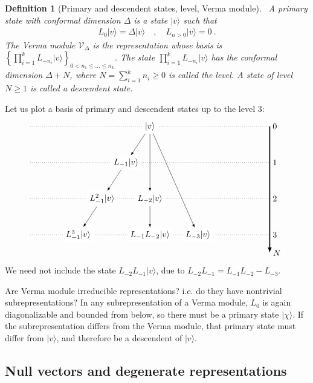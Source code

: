\documentclass[12pt, a4paper]{article}
\theoremstyle{break}
\newtheorem{defn}[exo]{Definition}
\begin{document}
\begin{defn}[Primary and descendent states, level, Verma module]
 ~\label{def:prim}
 A primary state with conformal dimension $\Delta$ is a state $|v\rangle$ such that 
 \begin{align}
  L_0 |v\rangle = \Delta |v\rangle \quad , \quad L_{n>0} |v\rangle = 0\ .
 \end{align}
The Verma module $\mathcal V_\Delta$ is the representation whose basis is 
 $
 \left\{ \prod_{i=1}^k L_{-n_i} |v\rangle\right\}_{ 0<n_1\leq \dots \leq n_k}
 $.
The state $\prod_{i=1}^k L_{-n_i} |v\rangle $ has the conformal dimension $\Delta+N$, where $N=\sum_{i=1}^k n_i\geq 0$ is called the level. A state of level $N\geq 1$ is called a descendent state.
\end{defn}
Let us plot a basis of primary and descendent states up to the level $3$:
\begin{align}
 \begin{tikzpicture}[scale = .25, baseline=(current  bounding  box.center)]
  \draw[-latex, very thick] (20, 0) -- (20, -21) node [right] {$N$};
  \foreach \x in {0, ..., 3}
  {
  \draw [dotted] (-20, {-6*\x}) -- (20, {-6*\x}) node [right] {${\x}$};
  }
  \node[fill = white] at (0, 0) (0) {$|v\rangle$};
  \node[fill = white] at (-4,-6) (1) {$L_{-1}|v\rangle$};
  \node[fill = white] at (-8, -12) (11) {$L_{-1}^2|v\rangle$};
  \node[fill = white] at (-12, -18) (111) {$L_{-1}^3|v\rangle$};
  \node[fill = white] at (0,-12) (2) {$L_{-2}|v\rangle$};
  \node[fill = white] at (0,-18) (12) {$L_{-1}L_{-2}|v\rangle$};
  \node[fill = white] at (8,-18) (3) {$L_{-3}|v\rangle$};
  \draw[-latex] (0) -- (1);
  \draw[-latex] (1) -- (11);
  \draw[-latex] (11) -- (111);
  \draw[-latex] (0) -- (2);
  \draw[-latex] (0) -- (3);
  \draw[-latex] (2) -- (12);
 \end{tikzpicture}
\end{align}
We need not include the state $L_{-2}L_{-1}|v\rangle$, due to $L_{-2}L_{-1} = L_{-1}L_{-2} - L_{-3}$.

Are Verma module irreducible representations? i.e. do they have nontrivial subrepresentations? In any subrepresentation of a Verma module, $L_0$ is again diagonalizable and bounded from below, so there must be a primary state $|\chi\rangle$. If the subrepresentation differs from the Verma module, that primary state must differ from $|v\rangle$, and therefore be a descendent of $|v\rangle$.


\subsection{Null vectors and degenerate representations}\label{sec:nv}
\end{document}

